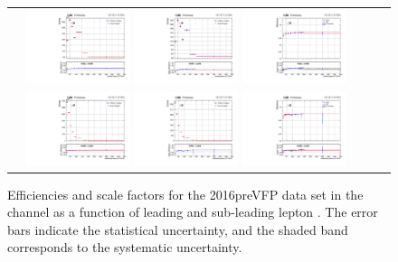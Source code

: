 \begin{figure}[!htb]
  \begin{center}
    \begin{tabular}{ccc}
      \includegraphics[width=0.30\textwidth]{fig_2016preVFP_TrigSF/g_lepApt_mumu_MC.pdf}
      \includegraphics[width=0.30\textwidth]{fig_2016preVFP_TrigSF/g_lepApt_mumu_data.pdf}
      \includegraphics[width=0.30\textwidth]{fig_2016preVFP_TrigSF/g_mumu_lepApt_FullSystUncBand.pdf}\\
      \includegraphics[width=0.30\textwidth]{fig_2016preVFP_TrigSF/g_lepBpt_mumu_MC.pdf}
      \includegraphics[width=0.30\textwidth]{fig_2016preVFP_TrigSF/g_lepBpt_mumu_data.pdf}
      \includegraphics[width=0.30\textwidth]{fig_2016preVFP_TrigSF/g_mumu_lepBpt_FullSystUncBand.pdf}\\
    \end{tabular}
    \caption{Efficiencies and scale factors for the 2016preVFP data set in the \mumu channel as a function of leading and sub-leading lepton \pT.
            The error bars indicate the statistical uncertainty, and the shaded band corresponds to the systematic uncertainty.
            }
    \label{TrigSF_2016preVFP_3}
  \end{center}
\end{figure}

